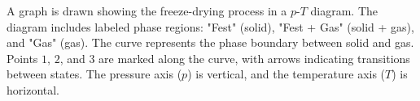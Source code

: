 A graph is drawn showing the freeze-drying process in a \( p \)-\( T \) diagram. The diagram includes labeled phase regions: "Fest" (solid), "Fest + Gas" (solid + gas), and "Gas" (gas). The curve represents the phase boundary between solid and gas. Points \( 1 \), \( 2 \), and \( 3 \) are marked along the curve, with arrows indicating transitions between states. The pressure axis (\( p \)) is vertical, and the temperature axis (\( T \)) is horizontal.